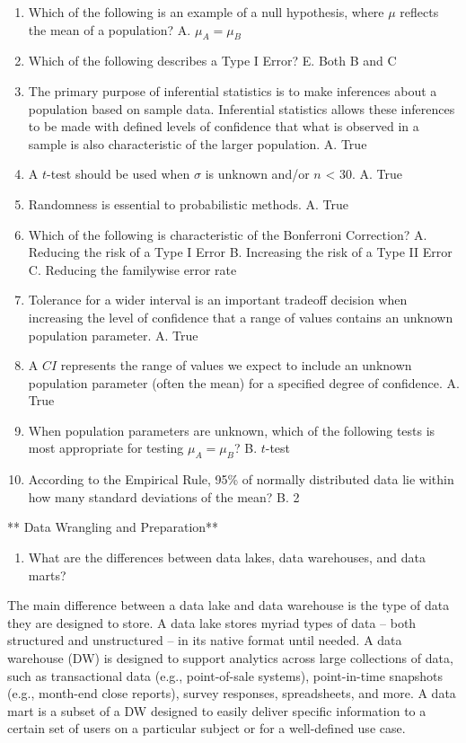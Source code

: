 \documentclass[]{book}
\providecommand{\tightlist}{%
  \setlength{\itemsep}{0pt}\setlength{\parskip}{0pt}}
\begin{document}
\begin{enumerate}
\def\labelenumi{\arabic{enumi}.}
\item
  Which of the following is an example of a null hypothesis, where \(\mu\) reflects the mean of a population?
  A. \(\mu_A = \mu_B\)
\item
  Which of the following describes a Type I Error?
  E. Both B and C
\item
  The primary purpose of inferential statistics is to make inferences about a population based on sample data. Inferential statistics allows these inferences to be made with defined levels of confidence that what is observed in a sample is also characteristic of the larger population.
  A. True
\item
  A \(t\)-test should be used when \(\sigma\) is unknown and/or \(n\) \textless{} 30.
  A. True
\item
  Randomness is essential to probabilistic methods.
  A. True
\item
  Which of the following is characteristic of the Bonferroni Correction?
  A. Reducing the risk of a Type I Error
  B. Increasing the risk of a Type II Error
  C. Reducing the familywise error rate
\item
  Tolerance for a wider interval is an important tradeoff decision when increasing the level of confidence that a range of values contains an unknown population parameter.
  A. True
\item
  A \(CI\) represents the range of values we expect to include an unknown population parameter (often the mean) for a specified degree of confidence.
  A. True
\item
  When population parameters are unknown, which of the following tests is most appropriate for testing \(\mu_A = \mu_B\)?
  B. \(t\)-test
\item
  According to the Empirical Rule, 95\% of normally distributed data lie within how many standard deviations of the mean?
  B. 2
\end{enumerate}

** Data Wrangling and Preparation**

\begin{enumerate}
\def\labelenumi{\arabic{enumi}.}
\tightlist
\item
  What are the differences between data lakes, data warehouses, and data marts?
\end{enumerate}

The main difference between a data lake and data warehouse is the type of data they are designed to store. A data lake stores myriad types of data -- both structured and unstructured -- in its native format until needed. A data warehouse (DW) is designed to support analytics across large collections of data, such as transactional data (e.g., point-of-sale systems), point-in-time snapshots (e.g., month-end close reports), survey responses, spreadsheets, and more. A data mart is a subset of a DW designed to easily deliver specific information to a certain set of users on a particular subject or for a well-defined use case.
\end{document}
